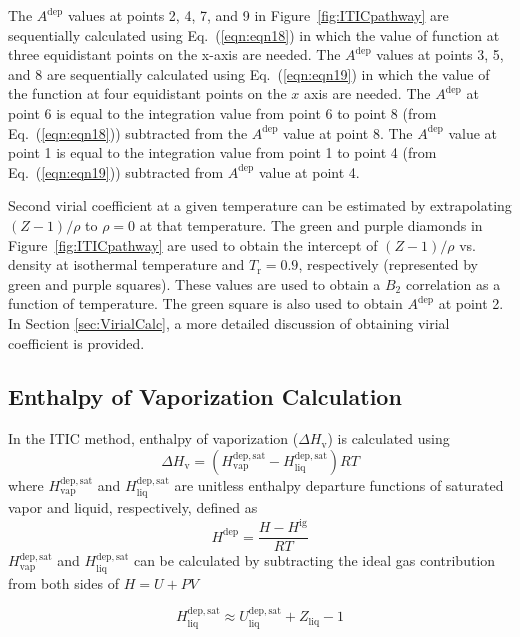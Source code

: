 \documentclass[5p,times]{elsarticle}
\begin{document}
The $A^{\mathrm{dep}}$ values at points 2, 4, 7, and 9 in Figure~\ref{fig:ITICpathway} are sequentially calculated using Eq.~(\ref{eqn:eqn18}) in which the value of function at three equidistant points on the x-axis are needed. The $A^{\mathrm{dep}}$ values at points 3, 5, and 8 are sequentially calculated using Eq.~(\ref{eqn:eqn19}) in which the value of the function at four equidistant points on the $x$ axis are needed. The $A^{\mathrm{dep}}$ at point 6 is equal to the integration value from point 6 to point 8 (from Eq.~(\ref{eqn:eqn18})) subtracted from the $A^{\mathrm{dep}}$ value at point 8. The $A^{\mathrm{dep}}$ value at point 1 is equal to the integration value from point 1 to point 4 (from Eq.~(\ref{eqn:eqn19})) subtracted from $A^{\mathrm{dep}}$ value at point 4. 

Second virial coefficient at a given temperature can be estimated by extrapolating $(Z-1)/\rho$ to $\rho=0$ at that temperature. The green and purple diamonds in Figure~\ref{fig:ITICpathway} are used to obtain the intercept of $(Z-1)/\rho$ vs. density at isothermal temperature and $T_{\mathrm{r}}=0.9$, respectively (represented by green and purple squares). These values are used to obtain a $B_2$ correlation as a function of temperature. The green square is also used to obtain $A^\mathrm{dep}$ at point 2. In Section \ref{sec:VirialCalc}, a more detailed discussion of obtaining virial coefficient is provided.

\subsection{Enthalpy of Vaporization Calculation}\label{sec:HvapCalc}
In the ITIC method, enthalpy of vaporization ($\Delta H_\mathrm{v}$) is calculated using
\begin{equation}
\Delta H_\mathrm{v}= ( H^{\mathrm{dep,sat}}_\mathrm{vap} - H^{\mathrm{dep,sat}}_\mathrm{liq})RT
\label{eqn:Hvap}
\end{equation}
where $H^{\mathrm{dep,sat}}_\mathrm{vap}$ and $H^{\mathrm{dep,sat}}_\mathrm{liq}$ are unitless enthalpy departure functions of saturated vapor and liquid, respectively, defined as
\begin{equation}
H^{\mathrm{dep}}=\frac{H-H^{\mathrm{ig}}}{RT}
\label{hdep}
\end{equation}
$H^{\mathrm{dep,sat}}_\mathrm{vap}$ and $H^{\mathrm{dep,sat}}_\mathrm{liq}$  can be calculated by subtracting the ideal gas contribution from both sides of $H=U+PV$

\begin{equation}
H^{\mathrm{dep,sat}}_\mathrm{liq} \approx U^{\mathrm{dep, sat}}_\mathrm{liq}+Z_\mathrm{liq} - 1
\label{eqn:HsatLiq}
\end{equation}
\end{document}
